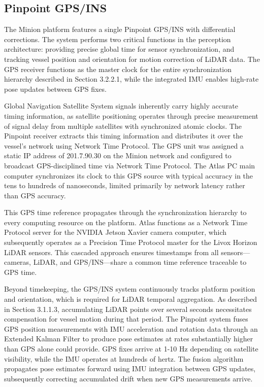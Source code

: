 \documentclass{erauthesis}
\begin{document}
        \subsection{Pinpoint GPS/INS}

The Minion platform features a single Pinpoint \ac{GPS}/\ac{INS} with differential corrections.
The system performs two critical functions in the perception architecture: providing precise global time for sensor synchronization, and tracking vessel position and orientation for motion correction of \ac{LiDAR} data.
The \ac{GPS} receiver functions as the master clock for the entire synchronization hierarchy described in Section 3.2.2.1, while the integrated \ac{IMU} enables high-rate pose updates between \ac{GPS} fixes.

Global Navigation Satellite System signals inherently carry highly accurate timing information, as satellite positioning operates through precise measurement of signal delay from multiple satellites with synchronized atomic clocks.
The Pinpoint receiver extracts this timing information and distributes it over the vessel's network using Network Time Protocol.
The \ac{GPS} unit was assigned a static IP address of 201.7.90.30 on the Minion network and configured to broadcast \ac{GPS}-disciplined time via Network Time Protocol.
The Atlas PC main computer synchronizes its clock to this \ac{GPS} source with typical accuracy in the tens to hundreds of nanoseconds, limited primarily by network latency rather than \ac{GPS} accuracy.

This \ac{GPS} time reference propagates through the synchronization hierarchy to every computing resource on the platform.
Atlas functions as a Network Time Protocol server for the NVIDIA Jetson Xavier camera computer, which subsequently operates as a Precision Time Protocol master for the Livox Horizon \ac{LiDAR} sensors.
This cascaded approach ensures timestamps from all sensors—cameras, \ac{LiDAR}, and \ac{GPS}/\ac{INS}—share a common time reference traceable to \ac{GPS} time.

Beyond timekeeping, the \ac{GPS}/\ac{INS} system continuously tracks platform position and orientation, which is required for \ac{LiDAR} temporal aggregation.
As described in Section 3.1.1.3, accumulating \ac{LiDAR} points over several seconds necessitates compensation for vessel motion during that period.
The Pinpoint system fuses \ac{GPS} position measurements with \ac{IMU} acceleration and rotation data through an Extended Kalman Filter to produce pose estimates at rates substantially higher than \ac{GPS} alone could provide.
\ac{GPS} fixes arrive at 1-10 Hz depending on satellite visibility, while the \ac{IMU} operates at hundreds of hertz.
The fusion algorithm propagates pose estimates forward using \ac{IMU} integration between \ac{GPS} updates, subsequently correcting accumulated drift when new \ac{GPS} measurements arrive.
\end{document}
